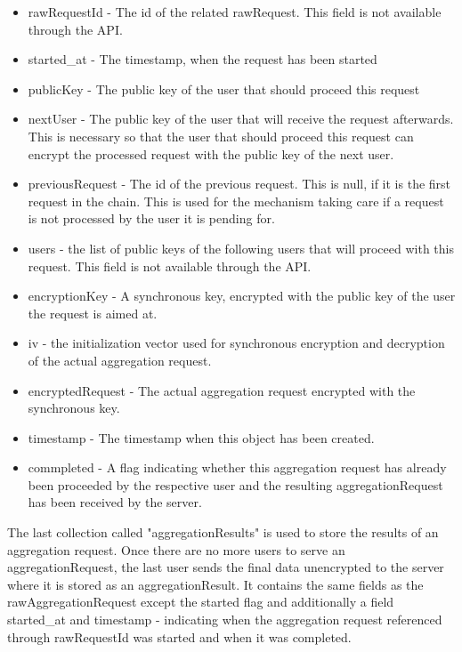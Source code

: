 \begin{itemize}
	\item rawRequestId - The id of the related rawRequest. This field is not available through the API.
	\item started_at - The timestamp, when the request has been started
	\item publicKey - The public key of the user that should proceed this request
	\item nextUser - The public key of the user that will receive the request afterwards. This is necessary so that the user that should proceed this request can encrypt the processed request with the public key of the next user.
	\item previousRequest - The id of the previous request. This is null, if it is the first request in the chain. This is used for the mechanism taking care if a request is not processed by the user it is pending for.
	\item users - the list of public keys of the following users that will proceed with this request. This field is not available through the API.
	\item encryptionKey - A synchronous key, encrypted with the public key of the user the request is aimed at.
	\item iv - the initialization vector used for synchronous encryption and decryption of the actual aggregation request.
	\item encryptedRequest - The actual aggregation request encrypted with the synchronous key.
	\item timestamp - The timestamp when this object has been created.
	\item commpleted - A flag indicating whether this aggregation request has already been proceeded by the respective user and the resulting aggregationRequest has been received by the server.
\end{itemize}
The last collection called "aggregationResults" is used to store the results of an aggregation request. Once there are no more users to serve an aggregationRequest, the last user sends the final data unencrypted to the server where it is stored as an aggregationResult. It contains the same fields as the rawAggregationRequest except the started flag and additionally a field started_at and timestamp - indicating when the aggregation request referenced through rawRequestId was started and when it was completed.